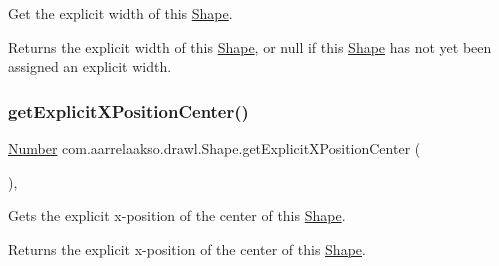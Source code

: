 Get the explicit width of this \hyperlink{classcom_1_1aarrelaakso_1_1drawl_1_1_shape}{Shape}. 

\begin{DoxyReturn}{Returns}
the explicit width of this \hyperlink{classcom_1_1aarrelaakso_1_1drawl_1_1_shape}{Shape}, or {\ttfamily null} if this \hyperlink{classcom_1_1aarrelaakso_1_1drawl_1_1_shape}{Shape} has not yet been assigned an explicit width. 
\end{DoxyReturn}
\mbox{\label{classcom_1_1aarrelaakso_1_1drawl_1_1_shape_aa1fbd5a290bc5d2df437f0bd79f30a89}} 
\subsubsection{\texorpdfstring{get\+Explicit\+X\+Position\+Center()}{getExplicitXPositionCenter()}}
{\footnotesize\ttfamily \hyperlink{interfacecom_1_1aarrelaakso_1_1drawl_1_1_number}{Number} com.\+aarrelaakso.\+drawl.\+Shape.\+get\+Explicit\+X\+Position\+Center (\begin{DoxyParamCaption}{ }\end{DoxyParamCaption})\hspace{0.3cm}{\ttfamily [protected]}, {\ttfamily [inherited]}}



Gets the explicit x-\/position of the center of this \hyperlink{classcom_1_1aarrelaakso_1_1drawl_1_1_shape}{Shape}. 

\begin{DoxyReturn}{Returns}
the explicit x-\/position of the center of this \hyperlink{classcom_1_1aarrelaakso_1_1drawl_1_1_shape}{Shape}. 
\end{DoxyReturn}
\mbox{\label{classcom_1_1aarrelaakso_1_1drawl_1_1_shape_abd7f6c77e2c62100bb72d8ad3085e288}} 
